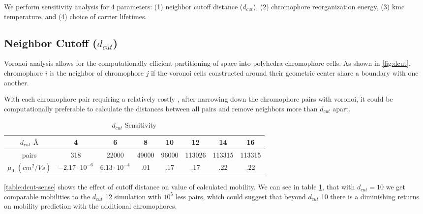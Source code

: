 We perform sensitivity analysis for $4$ parameters: (1) neighbor cutoff
distance ($d_{cut}$), (2) chromophore reorganization energy, (3) \gls{kmc}
temperature, and (4) choice of carrier lifetimes. 

\subsection{Neighbor Cutoff ($d_{cut}$)}
\label{dcutresults}
Voronoi analysis allows for the computationally efficient partitioning of space into
polyhedra chromophore cells. As shown in \ref{fig:dcut}, chromophore $i$ is the neighbor of chromophore $j$
if the voronoi cells constructed around their geometric center
share a boundary with one another. 

With each chromophore pair requiring a relatively costly , after narrowing down the chromophore pairs with voronoi, it
could be
computationally preferable to calculate the distances between all pairs and remove neighbors more than $d_{cut}$
apart.

\begin{table}
\caption{$d_{cut}$ Sensitivity}
\centering %
\begin{tabular}{c c c c c c c c} %
\hline\hline %
    $d_{cut}$ $\text{\AA}$ & 4 & 6 & 8 & 10 & 12 & 14 & 16 \\ [0.5ex] %
\hline  %
pairs & 318 & 22000 & 49000 & 96000 & 113026 & 113315 & 113315 \\ [1ex]%
$\mu_{0}$ $(cm^{2}/Vs)$ & $-2.17 \cdot 10^{-6}$ & $6.13 \cdot 10^{-4}$ & .01 & .17 & .17 & .22 & .22 \\ [1ex] %
\hline %
\end{tabular}
\label{table:dcut-sense} %
\end{table}

\autoref{table:dcut-sense} shows the effect of cutoff distance on value of
calculated mobility.  
 We can see in table \ref{table:dcut-sense}, that with $d_{cut}=10$ we get comparable mobilities to the
$d_{cut}$ 12 simulation with $10^5$ less
pairs, which could suggest that beyond $d_{cut}$ 10 there is a diminishing returns on mobility prediction with the
additional chromophores. 

